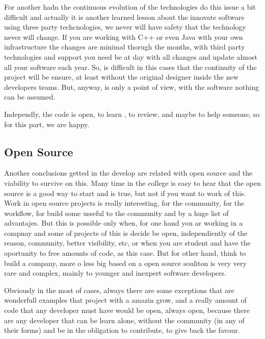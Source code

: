 For another hadn the continuous evolution of the technologies do this issue a
bit difficult and actually it is another learned lesson about the innovate
software using three party techcnologies, we never will have safety that the
technology never will change. If you are working with C++ or even Java with your
own infrastructure the changes are minimal thorugh the months, with third party
technologies and support you need be at day with all changes and update almost
all your software each year. So, is difficult in this cases that the continuity
of the project will be ensure, at least without the original designer inside the
new developers teams. But, anyway, is only a point of view, with the software
nothing can be assumed.

Independly, the code is open, to learn , to review, and maybe to help someone,
so for this part, we are happy.

\subsection{Open Source}

Another conclusions getted in the develop are related with open source and the
viability to survive on this. Many time in the college is easy to hear that the
open source is a good way to start and is true, but not if you want to work of
this. Work in open source projects is really interesting, for the community,
for the workflow, for build some usseful to the community and by a huge list of
advantajes. But this is possible only when, for one hand you ar working in a
compnay and some of projects of this is decide be open, independiently of the
reason, community, better visibility, etc, or when you are student and have
the oportunity to free amounts of code, as this case. But for other hand,
think to build a company, more o less big based on a open source souliton
is very very rare and complex, mainly to younger and inexpert  software developers.

Obviously in the most of cases, always there are some exceptions that are
wonderfull examples that project with a amazin grow, and a really amount of
code that any developer must have would be open, always open, because there
are any developer that can be learn alone, without the community (in any of their
forms) and be in the obligation to contribute, to give back the favour.
